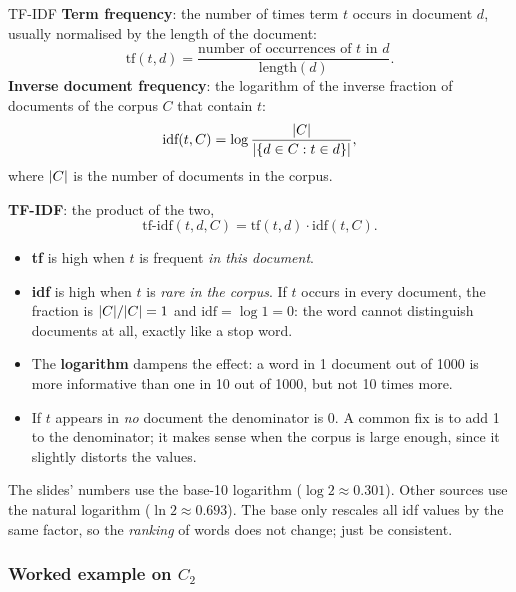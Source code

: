 \begin{nbdef}{TF-IDF}
\textbf{Term frequency}: the number of times term $t$ occurs in document $d$, usually
normalised by the length of the document:
\[
  \text{tf}(t, d) = \frac{\text{number of occurrences of } t \text{ in } d}{\text{length}(d)}.
\]
\textbf{Inverse document frequency}: the logarithm of the inverse fraction of documents
of the corpus $C$ that contain $t$:
\[
  \text{idf}(t, C) = \log \frac{\lvert C\rvert}{\lvert \{d \in C : t \in d\}\rvert},
\]
where $\lvert C\rvert$ is the number of documents in the corpus.

\textbf{TF-IDF}: the product of the two,
\[
  \text{tf-idf}(t, d, C) = \text{tf}(t, d) \cdot \text{idf}(t, C).
\]
\end{nbdef}

\begin{itemize}
  \item \textbf{tf} is high when $t$ is frequent \emph{in this document}.
  \item \textbf{idf} is high when $t$ is \emph{rare in the corpus}. If $t$ occurs in
        every document, the fraction is $\lvert C\rvert/\lvert C\rvert = 1$ and $\text{idf} = \log 1 = 0$:
        the word cannot distinguish documents at all, exactly like a stop word.
  \item The \textbf{logarithm} dampens the effect: a word in 1 document out of 1000 is
        more informative than one in 10 out of 1000, but not 10 times more.
  \item If $t$ appears in \emph{no} document the denominator is 0. A common fix is to
        add 1 to the denominator; it makes sense when the corpus is large enough, since
        it slightly distorts the values.
\end{itemize}

\begin{nbwarning}
The slides' numbers use the base-10 logarithm ($\log 2 \approx 0.301$). Other sources use
the natural logarithm ($\ln 2 \approx 0.693$). The base only rescales all idf values by
the same factor, so the \emph{ranking} of words does not change; just be consistent.
\end{nbwarning}

\subsubsection{Worked example on \texorpdfstring{$C_2$}{C2}}

